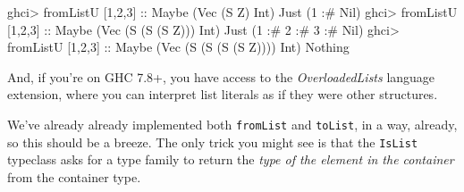 \documentclass[]{article}
\newenvironment{Shaded}{}{}
\newcommand{\DataTypeTok}[1]{\textcolor[rgb]{0.56,0.13,0.00}{#1}}
\newcommand{\DecValTok}[1]{\textcolor[rgb]{0.25,0.63,0.44}{#1}}
\newcommand{\NormalTok}[1]{#1}
\newcommand{\OperatorTok}[1]{\textcolor[rgb]{0.40,0.40,0.40}{#1}}
\newcommand{\OtherTok}[1]{\textcolor[rgb]{0.00,0.44,0.13}{#1}}
\begin{document}
\begin{Shaded}
\begin{Highlighting}[]
\NormalTok{ghci}\OperatorTok{\textgreater{}}\NormalTok{ fromListU [}\DecValTok{1}\NormalTok{,}\DecValTok{2}\NormalTok{,}\DecValTok{3}\NormalTok{]}\OtherTok{ ::} \DataTypeTok{Maybe}\NormalTok{ (}\DataTypeTok{Vec}\NormalTok{ (}\DataTypeTok{S} \DataTypeTok{Z}\NormalTok{) }\DataTypeTok{Int}\NormalTok{)}
\DataTypeTok{Just}\NormalTok{ (}\DecValTok{1} \OperatorTok{:\#} \DataTypeTok{Nil}\NormalTok{)}
\NormalTok{ghci}\OperatorTok{\textgreater{}}\NormalTok{ fromListU [}\DecValTok{1}\NormalTok{,}\DecValTok{2}\NormalTok{,}\DecValTok{3}\NormalTok{]}\OtherTok{ ::} \DataTypeTok{Maybe}\NormalTok{ (}\DataTypeTok{Vec}\NormalTok{ (}\DataTypeTok{S}\NormalTok{ (}\DataTypeTok{S}\NormalTok{ (}\DataTypeTok{S} \DataTypeTok{Z}\NormalTok{))) }\DataTypeTok{Int}\NormalTok{)}
\DataTypeTok{Just}\NormalTok{ (}\DecValTok{1} \OperatorTok{:\#} \DecValTok{2} \OperatorTok{:\#} \DecValTok{3} \OperatorTok{:\#} \DataTypeTok{Nil}\NormalTok{)}
\NormalTok{ghci}\OperatorTok{\textgreater{}}\NormalTok{ fromListU [}\DecValTok{1}\NormalTok{,}\DecValTok{2}\NormalTok{,}\DecValTok{3}\NormalTok{]}\OtherTok{ ::} \DataTypeTok{Maybe}\NormalTok{ (}\DataTypeTok{Vec}\NormalTok{ (}\DataTypeTok{S}\NormalTok{ (}\DataTypeTok{S}\NormalTok{ (}\DataTypeTok{S}\NormalTok{ (}\DataTypeTok{S} \DataTypeTok{Z}\NormalTok{)))) }\DataTypeTok{Int}\NormalTok{)}
\DataTypeTok{Nothing}
\end{Highlighting}
\end{Shaded}

And, if you're on GHC 7.8+, you have access to the \emph{OverloadedLists}
language extension, where you can interpret list literals as if they were other
structures.

We've already already implemented both \texttt{fromList} and \texttt{toList}, in
a way, already, so this should be a breeze. The only trick you might see is that
the \texttt{IsList} typeclass asks for a type family to return the \emph{type of
the element in the container} from the container type.
\end{document}
